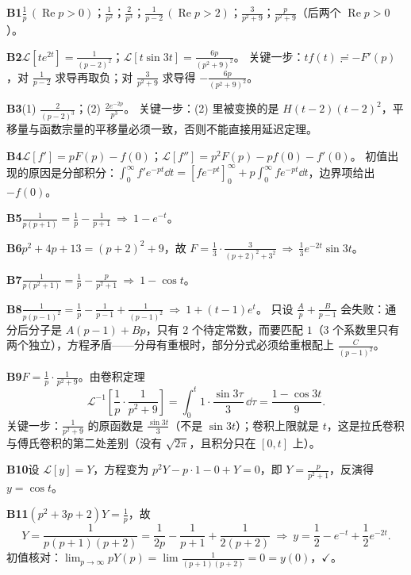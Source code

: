 \documentclass[11pt]{ctexart}
\begin{document}
\textbf{B1}\quad $\frac1p\,(\operatorname{Re}p>0)$；$\frac1{p^2}$；$\frac2{p^3}$；$\frac{1}{p-2}\,(\operatorname{Re}p>2)$；$\frac{3}{p^2+9}$；$\frac{p}{p^2+9}$（后两个 $\operatorname{Re}p>0$）。

\textbf{B2}\quad $\mathcal L[te^{2t}]=\frac{1}{(p-2)^2}$；$\mathcal L[t\sin 3t]=\frac{6p}{(p^2+9)^2}$。
关键一步：$tf(t)\risingdotseq-F'(p)$，对 $\frac{1}{p-2}$ 求导再取负；对 $\frac{3}{p^2+9}$ 求导得 $-\frac{6p}{(p^2+9)^2}$。

\textbf{B3}\quad (1) $\frac{2}{(p-2)^3}$；(2) $\frac{2e^{-2p}}{p^3}$。
关键一步：(2) 里被变换的是 $H(t-2)(t-2)^2$，平移量与函数宗量的平移量必须一致，否则不能直接用延迟定理。

\textbf{B4}\quad $\mathcal L[f']=pF(p)-f(0)$；$\mathcal L[f'']=p^2F(p)-pf(0)-f'(0)$。
初值出现的原因是分部积分：$\int_0^{\infty}f'e^{-pt}\dd t=\left[fe^{-pt}\right]_0^{\infty}+p\int_0^{\infty}fe^{-pt}\dd t$，边界项给出 $-f(0)$。

\textbf{B5}\quad $\frac{1}{p(p+1)}=\frac1p-\frac{1}{p+1}\ \Rightarrow\ 1-e^{-t}$。

\textbf{B6}\quad $p^2+4p+13=(p+2)^2+9$，故 $F=\frac13\cdot\frac{3}{(p+2)^2+3^2}\ \Rightarrow\ \frac13e^{-2t}\sin 3t$。

\textbf{B7}\quad $\frac{1}{p(p^2+1)}=\frac1p-\frac{p}{p^2+1}\ \Rightarrow\ 1-\cos t$。

\textbf{B8}\quad $\frac{1}{p(p-1)^2}=\frac1p-\frac{1}{p-1}+\frac{1}{(p-1)^2}\ \Rightarrow\ 1+(t-1)e^{t}$。
只设 $\frac Ap+\frac{B}{p-1}$ 会失败：通分后分子是 $A(p-1)+Bp$，只有 2 个待定常数，而要匹配 $1$（3 个系数里只有两个独立），方程矛盾——分母有重根时，部分分式必须给重根配上 $\frac{C}{(p-1)^2}$。

\textbf{B9}\quad $F=\frac{1}{p}\cdot\frac{1}{p^2+9}$。由卷积定理
\[ \mathcal L^{-1}\left[\frac{1}{p}\cdot\frac{1}{p^2+9}\right]=\int_0^{t}1\cdot\frac{\sin 3\tau}{3}\,\dd\tau=\frac{1-\cos 3t}{9}. \]
关键一步：$\frac{1}{p^2+9}$ 的原函数是 $\frac{\sin 3t}{3}$（不是 $\sin 3t$）；卷积上限就是 $t$，这是拉氏卷积与傅氏卷积的第二处差别（没有 $\sqrt{2\pi}$，且积分只在 $[0,t]$ 上）。

\textbf{B10}\quad 设 $\mathcal L[y]=Y$，方程变为 $p^2Y-p\cdot1-0+Y=0$，即 $Y=\frac{p}{p^2+1}$，反演得 $y=\cos t$。

\textbf{B11}\quad $(p^2+3p+2)Y=\frac1p$，故
\[ Y=\frac{1}{p(p+1)(p+2)}=\frac{1}{2p}-\frac{1}{p+1}+\frac{1}{2(p+2)}\ \Rightarrow\ y=\frac12-e^{-t}+\frac12e^{-2t}. \]
初值核对：$\lim_{p\to\infty}pY(p)=\lim\frac{1}{(p+1)(p+2)}=0=y(0)$，$\checkmark$。
\end{document}
